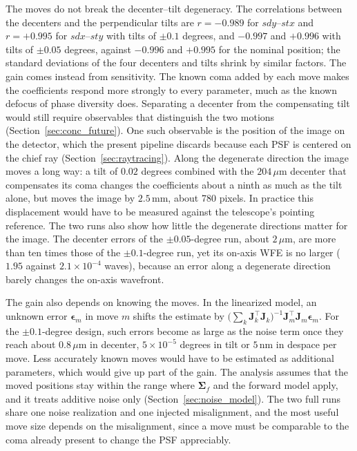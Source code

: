 The moves do not break the decenter--tilt degeneracy. The correlations between the decenters and the perpendicular tilts are $r=-0.989$ for $sdy$--$stx$ and $r=+0.995$ for $sdx$--$sty$ with tilts of $\pm0.1$ degrees, and $-0.997$ and $+0.996$ with tilts of $\pm0.05$ degrees, against $-0.996$ and $+0.995$ for the nominal position; the standard deviations of the four decenters and tilts shrink by similar factors. The gain comes instead from sensitivity. The known coma added by each move makes the coefficients respond more strongly to every parameter, much as the known defocus of phase diversity does. Separating a decenter from the compensating tilt would still require observables that distinguish the two motions (Section~\ref{sec:conc_future}). One such observable is the position of the image on the detector, which the present pipeline discards because each PSF is centered on the chief ray (Section~\ref{sec:raytracing}). Along the degenerate direction the image moves a long way: a tilt of $0.02$ degrees combined with the $204\,\mu\mathrm{m}$ decenter that compensates its coma changes the coefficients about a ninth as much as the tilt alone, but moves the image by $2.5$\,mm, about 780 pixels. In practice this displacement would have to be measured against the telescope's pointing reference. The two runs also show how little the degenerate directions matter for the image. The decenter errors of the $\pm0.05$-degree run, about $2\,\mu\mathrm{m}$, are more than ten times those of the $\pm0.1$-degree run, yet its on-axis WFE is no larger ($1.95$ against $2.1\times10^{-4}$ waves), because an error along a degenerate direction barely changes the on-axis wavefront.

The gain also depends on knowing the moves. In the linearized model, an unknown error $\boldsymbol{\epsilon}_m$ in move $m$ shifts the estimate by $\bigl(\sum_{k}\mathbf{J}_k^{\top}\mathbf{J}_k\bigr)^{-1}\mathbf{J}_m^{\top}\mathbf{J}_m\boldsymbol{\epsilon}_m$. For the $\pm0.1$-degree design, such errors become as large as the noise term once they reach about $0.8\,\mu\mathrm{m}$ in decenter, $5\times10^{-5}$ degrees in tilt or $5$\,nm in despace per move. Less accurately known moves would have to be estimated as additional parameters, which would give up part of the gain. The analysis assumes that the moved positions stay within the range where $\boldsymbol{\Sigma}_f$ and the forward model apply, and it treats additive noise only (Section~\ref{sec:noise_model}). The two full runs share one noise realization and one injected misalignment, and the most useful move size depends on the misalignment, since a move must be comparable to the coma already present to change the PSF appreciably.

